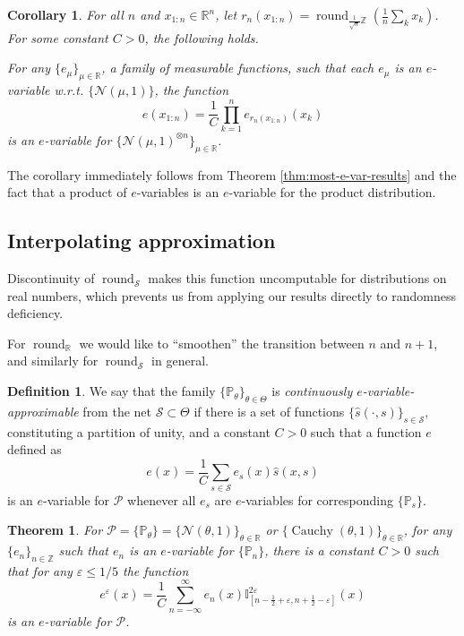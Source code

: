 \documentclass{article}
\newtheorem*{corollary}{Corollary}
\newtheorem{theorem}{Theorem}
\theoremstyle{definition}
\theoremstyle{definition}
\newtheorem{definition}{Definition}[section]
\newcommand{\intnums}{\mathbb{Z}}
\newcommand{\reals}{\mathbb{R}}
\newcommand{\probP}{\mathbb{P}}
\newcommand{\Cauchy}{\operatorname{Cauchy}}
\begin{document}
\begin{corollary}
    For all $n$ and $x_{1:n} \in \reals^n$, let $r_n(x_{1:n})=\operatorname{round}_{\frac{1}{\sqrt{n}}\intnums}\left(\frac{1}{n}\sum_k x_k\right)$. For some constant $C > 0$, the following holds.
    
    For any $\{e_\mu\}_{\mu\in\reals}$, a family of measurable functions, such that each $e_\mu$ is an $e$-variable w.r.t. $\{\mathcal{N}(\mu,1)\}$, the function
    \[
        e(x_{1:n}) = \frac{1}{C}\prod_{k=1}^n e_{r_n(x_{1:n})}(x_k)
    \]
    is an $e$-variable for $\{\mathcal{N}(\mu,1)^{\otimes n}\}_{\mu\in\reals}$.
\end{corollary}

The corollary immediately follows from Theorem \ref{thm:most-e-var-results} and the fact that a product of $e$-variables is an $e$-variable for the product distribution.

\subsection{Interpolating approximation}\label{sec:interp-appr}

Discontinuity of $\operatorname{round}_{\mathcal{S}}$ makes this function uncomputable for distributions on real numbers, which prevents us from applying our results directly to randomness deficiency.

For $\operatorname{round}_{\reals}$ we would like to ``smoothen'' the transition  between $n$ and $n+1$, and similarly for $\operatorname{round}_\mathcal{S}$ in general.

\begin{definition}
    We say that the family $\{\probP_\theta\}_{\theta\in\Theta}$ is \emph{continuously $e$-variable-approximable} from the net $\mathcal{S} \subset \Theta$ if there is a set of functions $\{\hat s(\cdot,s)\}_{s\in\mathcal{S}}$, constituting a partition of unity, and a constant $C > 0$ such that a function $e$ defined as
    \[
        e(x) = \frac{1}{C}\sum_{s\in \mathcal{S}} e_s(x) \hat s(x, s)
    \]
    is an $e$-variable for $\mathcal{P}$ whenever all $e_s$ are $e$-variables for corresponding $\{\probP_s\}$.
\end{definition}

\begin{theorem}\label{thm:contin-e-var}
    For $\mathcal{P} = \{\probP_\theta\}=\{\mathcal{N}(\theta,1)\}_{\theta\in\reals}$ or $\{\Cauchy(\theta,1)\}_{\theta\in\reals}$, for any $\{e_n\}_{n\in\intnums}$ such that $e_n$ is an $e$-variable for $\{\probP_n\}$, there is a constant $C>0$ such that for any $\varepsilon \le 1/5$ the function
    \[
        e^\varepsilon(x) = \frac{1}{C} \sum_{n=-\infty}^\infty e_n(x) \mathbb{I}_{\left[n-\frac{1}{2}+\varepsilon, n + \frac{1}{2}-\varepsilon\right]}^{2\varepsilon}(x)
    \]
    is an $e$-variable for $\mathcal{P}$.
\end{theorem}
\end{document}
